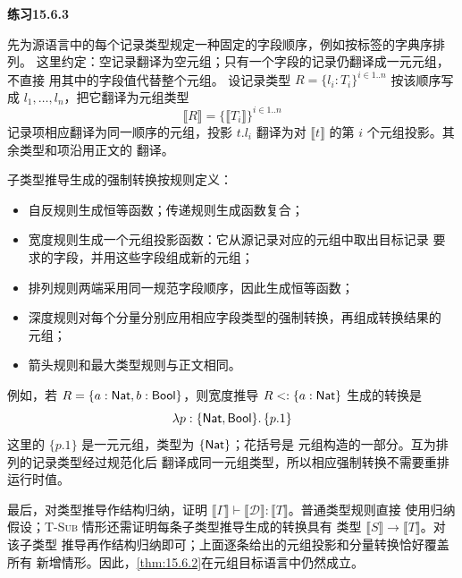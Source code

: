 \begin{taplsolutionentrybox}
\label{sol:translator:15.6.3}
\textbf{练习15.6.3}

先为源语言中的每个记录类型规定一种固定的字段顺序，例如按标签的字典序排列。
这里约定：空记录翻译为空元组；只有一个字段的记录仍翻译成一元元组，不直接
用其中的字段值代替整个元组。
设记录类型 \(R=\{l_i:T_i\}^{i\in1..n}\) 按该顺序写成
\(l_1,\ldots,l_n\)，把它翻译为元组类型
\[
  \llbracket R\rrbracket
  =\{\llbracket T_i\rrbracket\}^{i\in1..n}
\]
记录项相应翻译为同一顺序的元组，投影 \(t.l_i\) 翻译为对
\(\llbracket t\rrbracket\) 的第 \(i\) 个元组投影。其余类型和项沿用正文的
翻译。

子类型推导生成的强制转换按规则定义：
\begin{itemize}
\item 自反规则生成恒等函数；传递规则生成函数复合；
\item 宽度规则生成一个元组投影函数：它从源记录对应的元组中取出目标记录
  要求的字段，并用这些字段组成新的元组；
\item 排列规则两端采用同一规范字段顺序，因此生成恒等函数；
\item 深度规则对每个分量分别应用相应字段类型的强制转换，再组成转换结果的
  元组；
\item 箭头规则和最大类型规则与正文相同。
\end{itemize}
例如，若
\(R=\{a:\mathsf{Nat},b:\mathsf{Bool}\}\)，则宽度推导
\(R\mathrel{<:}\{a:\mathsf{Nat}\}\) 生成的转换是
\[
  \lambda p:\{\mathsf{Nat},\mathsf{Bool}\}.\,\{p.1\}
\]
这里的 \(\{p.1\}\) 是一元元组，类型为 \(\{\mathsf{Nat}\}\)；花括号是
元组构造的一部分。互为排列的记录类型经过规范化后
翻译成同一元组类型，所以相应强制转换不需要重排运行时值。

最后，对类型推导作结构归纳，证明
\(\llbracket\Gamma\rrbracket\vdash
\llbracket\mathcal D\rrbracket:\llbracket T\rrbracket\)。普通类型规则直接
使用归纳假设；\textsc{T-Sub} 情形还需证明每条子类型推导生成的转换具有
类型 \(\llbracket S\rrbracket\to\llbracket T\rrbracket\)。对该子类型
推导再作结构归纳即可；上面逐条给出的元组投影和分量转换恰好覆盖所有
新增情形。因此，\cref{thm:15.6.2}在元组目标语言中仍然成立。

\end{taplsolutionentrybox}

